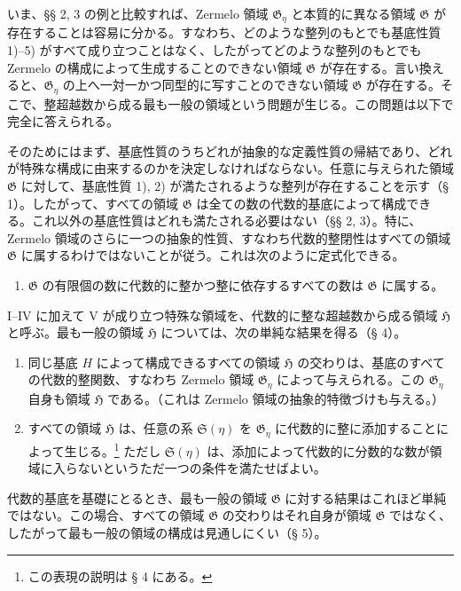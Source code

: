 いま、§§ 2, 3 の例と比較すれば、Zermelo 領域 $\mathfrak G_\eta$ と本質的に異なる領域 $\mathfrak G$ が存在することは容易に分かる。すなわち、どのような整列のもとでも基底性質 1)--5) がすべて成り立つことはなく、したがってどのような整列のもとでも Zermelo の構成によって生成することのできない領域 $\mathfrak G$ が存在する。言い換えると、$\mathfrak G_\eta$ の上へ一対一かつ同型的に写すことのできない領域 $\mathfrak G$ が存在する。そこで、整超越数から成る最も一般の領域という問題が生じる。この問題は以下で完全に答えられる。

そのためにはまず、基底性質のうちどれが抽象的な定義性質の帰結であり、どれが特殊な構成に由来するのかを決定しなければならない。任意に与えられた領域 $\mathfrak G$ に対して、基底性質 1), 2) が満たされるような整列が存在することを示す（§ 1）。したがって、すべての領域 $\mathfrak G$ は全ての数の代数的基底によって構成できる。これ以外の基底性質はどれも満たされる必要はない（§§ 2, 3）。特に、Zermelo 領域のさらに一つの抽象的性質、すなわち代数的整閉性はすべての領域 $\mathfrak G$ に属するわけではないことが従う。これは次のように定式化できる。
\begin{enumerate}
\item[V.] $\mathfrak G$ の有限個の数に代数的に整かつ整に依存するすべての数は $\mathfrak G$ に属する。
\end{enumerate}

I--IV に加えて V が成り立つ特殊な領域を、代数的に整な超越数から成る領域 $\mathfrak H$ と呼ぶ。最も一般の領域 $\mathfrak H$ については、次の単純な結果を得る（§ 4）。
\begin{enumerate}
\item[a)] 同じ基底 $H$ によって構成できるすべての領域 $\mathfrak H$ の交わりは、基底のすべての代数的整関数、すなわち Zermelo 領域 $\mathfrak G_\eta$ によって与えられる。この $\mathfrak G_\eta$ 自身も領域 $\mathfrak H$ である。（これは Zermelo 領域の抽象的特徴づけも与える。）
\item[b)] すべての領域 $\mathfrak H$ は、任意の系 $\mathfrak S(\eta)$ を $\mathfrak G_\eta$ に代数的に整に添加することによって生じる。\footnote{この表現の説明は § 4 にある。} ただし $\mathfrak S(\eta)$ は、添加によって代数的に分数的な数が領域に入らないというただ一つの条件を満たせばよい。
\end{enumerate}

代数的基底を基礎にとるとき、最も一般の領域 $\mathfrak G$ に対する結果はこれほど単純ではない。この場合、すべての領域 $\mathfrak G$ の交わりはそれ自身が領域 $\mathfrak G$ ではなく、したがって最も一般の領域の構成は見通しにくい（§ 5）。


